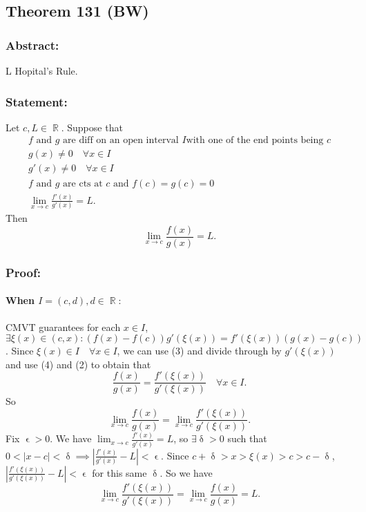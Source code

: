 \documentclass{article}
\DeclareMathOperator\eps{\epsilon}
\DeclareMathOperator\del{\delta}
\DeclareMathOperator\R{\mathbb{R}}
\begin{document}
\subsection{Theorem 131 (BW)}
\subsubsection*{Abstract:}
L Hopital's Rule.
\subsubsection*{Statement:}
Let $c,L \in \R$. Suppose that \begin{gather}
\text{$f$ and $g$ are diff on an open interval $I$
with one of the end points being $c$} \\
g(x) \neq 0 \quad \forall x \in I \\
g'(x) \neq 0 \quad \forall x \in I \\
\text{$f$ and $g$ are cts at $c$ and }f(c)=g(c)= 0 \\
\lim_{x \to c}\frac{f'(x)}{g'(x)}= L.
\end{gather}
Then $$\lim_{x \to c}\frac{f(x)}{g(x)}= L.$$
\subsubsection*{Proof:}
\paragraph{When $I=(c,d), d \in \R:$}
CMVT guarantees for each
$x \in I$, $\exists \xi(x) \in (c,x):(f(x)-f(c))g'(\xi(x))=f'(\xi(x))(g(x)-g(c))$.
Since $\xi(x) \in I \quad \forall x \in I$, we can use (3) and divide through by $g'(\xi(x))$ and
use (4) and (2) to obtain that \[
\frac{f(x)}{g(x)} = \frac{f'(\xi(x))}{g'(\xi(x))} \quad \forall x \in I.
\]
So \[
\lim_{x \to c}\frac{f(x)}{g(x)} = \lim_{x \to c}\frac{f'(\xi(x))}{g'(\xi(x))}.
\]
Fix $\eps>0$. We have $\lim_{x \to c}\frac{f'(x)}{g'(x)}= L$,
so $\exists \del >0$ such that $0<|x-c|<\del \implies \left| \frac{f'(x)}{g'(x)}-L \right| <\eps$.
Since $c+\del > x > \xi(x) > c > c- \del$, $ \left| \frac{f'(\xi(x))}{g'(\xi(x))}-L \right| <\eps$
for this same $\del$. So we have $$\lim_{x \to c}\frac{f'(\xi(x))}{g'(\xi(x))}= \lim_{x \to c}\frac{f(x)}{g(x)} = L.$$
\end{document}
